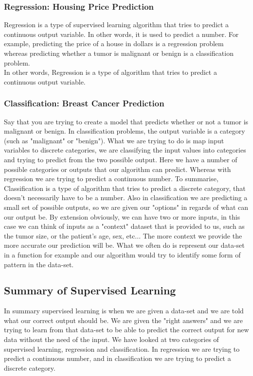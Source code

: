 \subsubsection*{Regression: Housing Price Prediction}
Regression is a type of supervised learning algorithm that tries to predict a continuous output variable. In other words, it is used to predict a number. For example, predicting the price of a house in dollars is a regression problem whereas predicting whether a tumor is malignant or benign is a classification problem. \\
In other words, Regression is a type of algorithm that tries to predict a continuous output variable.

\subsubsection*{Classification: Breast Cancer Prediction}
Say that you are trying to create a model that predicts whether or not a tumor is malignant or benign. In classification problems, the output variable is a category (such as "malignant" or "benign"). What we are trying to do is map input variables to discrete categories, we are classifying the input values into categories and trying to predict from the two possible output. Here we have a number of possible categories or outputs that our algorithm can predict. Whereas with regression we are trying to predict a continuous number.
To summarise, Classification is a type of algorithm that tries to predict a discrete category, that doesn't necessarily have to be a number. Also in classification we are predicting a small set of possible outputs, so we are given our "options" in regards of what can our output be.
By extension obviously, we can have two or more inputs, in this case we can think of inputs as a "context" dataset that is provided to us, such as the tumor size, or the patient's age, sex, etc... The more context we provide the more accurate our prediction will be.
What we often do is represent our data-set in a function for example and our algorithm would try to identify some form of pattern in the data-set.

\subsection{Summary of Supervised Learning}
In summary supervised learning is when we are given a data-set and we are told what our correct output should be. We are given the "right answers" and we are trying to learn from that data-set to be able to predict the correct output for new data without the need of the input.
We have looked at two categories of supervised learning, regression and classification. In regression we are trying to predict a continuous number, and in classification we are trying to predict a discrete category.


